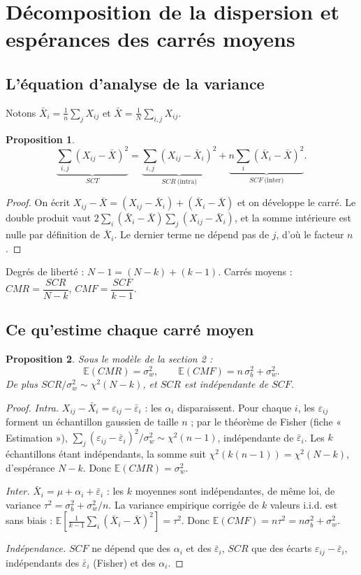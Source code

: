 \documentclass[11pt,a4paper]{article}
\theoremstyle{tq}
\newtheorem{prop}{Proposition}
\theoremstyle{remark}
\newcommand{\E}{\mathbb{E}}
\newcommand{\Xb}{\bar{X}}
\newcommand{\sw}{\sigma_w}
\newcommand{\sbt}{\sigma_b}
\begin{document}
\section{Décomposition de la dispersion et espérances des carrés moyens}

\subsection{L'équation d'analyse de la variance}

Notons $\Xb_i = \frac1n\sum_j X_{ij}$ et $\Xb = \frac1N\sum_{i,j}X_{ij}$.

\begin{prop}
\[
\underbrace{\sum_{i,j}(X_{ij}-\Xb)^2}_{SCT}
=\underbrace{\sum_{i,j}(X_{ij}-\Xb_i)^2}_{SCR\ \text{(intra)}}
+\underbrace{n\sum_{i}(\Xb_i-\Xb)^2}_{SCF\ \text{(inter)}}.
\]
\end{prop}
\begin{proof}
On écrit $X_{ij}-\Xb = (X_{ij}-\Xb_i)+(\Xb_i-\Xb)$ et on développe le carré. Le double produit vaut
$2\sum_i(\Xb_i-\Xb)\sum_j(X_{ij}-\Xb_i)$, et la somme intérieure est nulle par définition de $\Xb_i$. Le dernier terme ne dépend pas de $j$, d'où le facteur $n$.
\end{proof}

Degrés de liberté : $N-1 = (N-k)+(k-1)$. Carrés moyens : $CMR = \dfrac{SCR}{N-k}$, $CMF = \dfrac{SCF}{k-1}$.

\subsection{Ce qu'estime chaque carré moyen}

\begin{prop}\label{prop:ecm}
Sous le modèle de la section 2 :
\[
\E(CMR) = \sw^2,\qquad \E(CMF) = n\,\sbt^2 + \sw^2 .
\]
De plus $SCR/\sw^2 \sim \chi^2(N-k)$, et $SCR$ est indépendante de $SCF$.
\end{prop}
\begin{proof}
\emph{Intra.} $X_{ij}-\Xb_i = \varepsilon_{ij}-\bar\varepsilon_i$ : les $\alpha_i$ disparaissent. Pour chaque $i$, les $\varepsilon_{ij}$ forment un échantillon gaussien de taille $n$ ; par le théorème de Fisher (fiche « Estimation »), $\sum_j(\varepsilon_{ij}-\bar\varepsilon_i)^2/\sw^2 \sim \chi^2(n-1)$, indépendante de $\bar\varepsilon_i$. Les $k$ échantillons étant indépendants, la somme suit $\chi^2(k(n-1)) = \chi^2(N-k)$, d'espérance $N-k$. Donc $\E(CMR)=\sw^2$.

\emph{Inter.} $\Xb_i = \mu+\alpha_i+\bar\varepsilon_i$ : les $k$ moyennes sont indépendantes, de même loi, de variance $\tau^2 = \sbt^2+\sw^2/n$. La variance empirique corrigée de $k$ valeurs i.i.d. est sans biais : $\E\!\left[\frac{1}{k-1}\sum_i(\Xb_i-\Xb)^2\right]=\tau^2$. Donc $\E(CMF) = n\tau^2 = n\sbt^2+\sw^2$.

\emph{Indépendance.} $SCF$ ne dépend que des $\alpha_i$ et des $\bar\varepsilon_i$, $SCR$ que des écarts $\varepsilon_{ij}-\bar\varepsilon_i$, indépendants des $\bar\varepsilon_i$ (Fisher) et des $\alpha_i$.
\end{proof}
\end{document}
